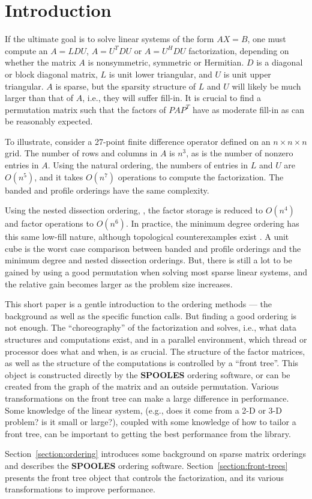 \section{Introduction}
\par
If the ultimate goal is to solve linear systems of the form
$AX = B$, one must compute an $A = LDU$, $A = U^TDU$ or
$A = U^HDU$ factorization, depending on whether the matrix $A$
is nonsymmetric, symmetric or Hermitian.
$D$ is a diagonal or block diagonal matrix,
$L$ is unit lower triangular,
and $U$ is unit upper triangular.
$A$ is sparse, but the sparsity structure of $L$ and $U$ will
likely be much larger than that of $A$,
i.e., they will suffer fill-in.
It is crucial to find a permutation matrix such that the factors of
$PAP^T$ have as moderate fill-in as can be reasonably expected.
\par
To illustrate, consider a 27-point finite difference operator defined
on an $n \times n \times n$ grid.
The number of rows and columns in $A$ is $n^3$, as is the number of
nonzero entries in $A$.
Using the natural ordering, the numbers of entries in $L$ and $U$ 
are $O(n^5)$, and it takes $O(n^7)$ operations to compute the
factorization.
The banded and profile orderings \cite{geo81-book} 
have the same complexity.
\par
Using the nested dissection ordering,
\cite{geo73-nested},
the factor storage is reduced to $O(n^4)$ and factor operations to
$O(n^6)$.
In practice, the minimum degree ordering has this same low-fill
nature, although topological counterexamples exist
\cite{ber90-mindeg}.
A unit cube is the worst case comparison between banded and profile
orderings and the minimum degree and nested dissection orderings.
But, there is still a lot to be gained by using a good permutation
when solving most sparse linear systems, and the relative gain
becomes larger as the problem size increases.
\par
This short paper is a gentle introduction to the ordering methods
--- the background as well as the specific function calls.
But finding a good ordering is not enough.
The ``choreography'' of the factorization and solves, i.e., what
data structures and computations exist, and in a parallel
environment, which thread or processor does what and when,
is as crucial.
The structure of the factor matrices, as well as the structure of the
computations is controlled by a ``front tree''.
This object is constructed directly by the {\bf SPOOLES} ordering
software, or can be created from the graph of the matrix and an
outside permutation.
Various transformations on the front tree can make a large
difference in performance.
Some knowledge of the linear system, (e.g., does it come from a 2-D
or 3-D problem? is it small or large?), coupled with some knowledge
of how to tailor a front tree, can be important to getting the best
performance from the library.
\par
Section~\ref{section:ordering} introduces some background on sparse
matrix orderings and describes the {\bf SPOOLES} ordering software.
Section~\ref{section:front-trees} presents the front tree object
that controls the factorization, and its various transformations
to improve performance.

